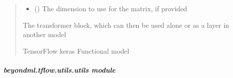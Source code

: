 \documentclass[letterpaper,10pt,english]{sphinxmanual}
\begin{document}
\begin{fulllineitems}
\begin{quote}
\begin{description}
\begin{itemize}
\item {} 
\sphinxAtStartPar
{} (\sphinxstyleliteralemphasis{\sphinxupquote{ (}}\sphinxstyleliteralemphasis{\sphinxupquote{)}}) \textendash{} The dimension to use for the  matrix, if provided

\end{itemize}

\sphinxAtStartPar
{} \textendash{} The transformer block, which can then be used alone or as
a layer in another model

\sphinxAtStartPar
TensorFlow keras Functional model

\end{description}\end{quote}

\end{fulllineitems}



\subparagraph{beyondml.tflow.utils.utils module}
\label{\detokenize{beyondml.tflow.utils:module-beyondml.tflow.utils.utils}}\label{\detokenize{beyondml.tflow.utils:beyondml-tflow-utils-utils-module}}
\end{document}
